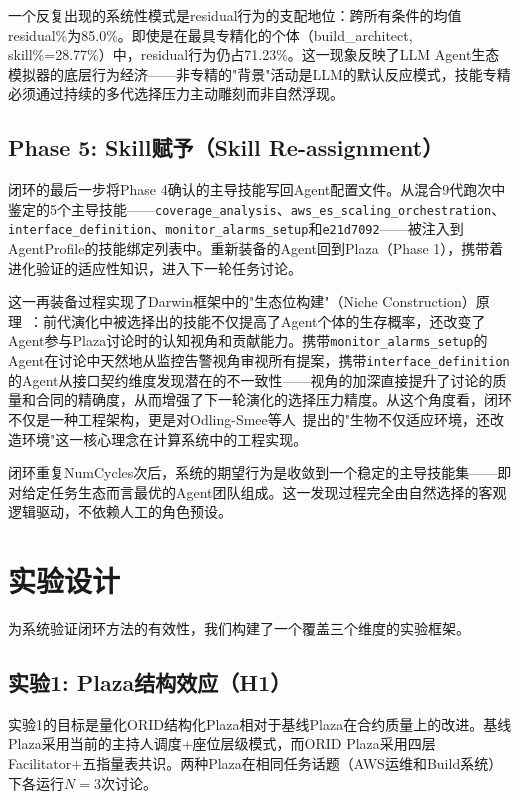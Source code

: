 \documentclass[conference]{IEEEtran}
\begin{document}
一个反复出现的系统性模式是residual行为的支配地位：跨所有条件的均值residual\%为85.0\%。即使是在最具专精化的个体（build\_architect, skill\%=28.77\%）中，residual行为仍占71.23\%。这一现象反映了LLM Agent生态模拟器的底层行为经济——非专精的"背景"活动是LLM的默认反应模式，技能专精必须通过持续的多代选择压力主动雕刻而非自然浮现。

\subsection{Phase 5: Skill赋予（Skill Re-assignment）}

闭环的最后一步将Phase 4确认的主导技能写回Agent配置文件。从混合9代跑次中鉴定的5个主导技能——{\texttt{coverage\_analysis}}、{\texttt{aws\_es\_scaling\_orchestration}}、{\texttt{interface\_definition}}、{\texttt{monitor\_alarms\_setup}}和{\texttt{e21d7092}}——被注入到AgentProfile的技能绑定列表中。重新装备的Agent回到Plaza（Phase 1），携带着进化验证的适应性知识，进入下一轮任务讨论。

这一再装备过程实现了Darwin框架中的"生态位构建"（Niche Construction）原理~\cite{odling2003niche}：前代演化中被选择出的技能不仅提高了Agent个体的生存概率，还改变了Agent参与Plaza讨论时的认知视角和贡献能力。携带{\texttt{monitor\_alarms\_setup}}的Agent在讨论中天然地从监控告警视角审视所有提案，携带{\texttt{interface\_definition}}的Agent从接口契约维度发现潜在的不一致性——视角的加深直接提升了讨论的质量和合同的精确度，从而增强了下一轮演化的选择压力精度。从这个角度看，闭环不仅是一种工程架构，更是对Odling-Smee等人~\cite{odling2003niche}提出的"生物不仅适应环境，还改造环境"这一核心理念在计算系统中的工程实现。

闭环重复NumCycles次后，系统的期望行为是收敛到一个稳定的主导技能集——即对给定任务生态而言最优的Agent团队组成。这一发现过程完全由自然选择的客观逻辑驱动，不依赖人工的角色预设。

\section{实验设计}

为系统验证闭环方法的有效性，我们构建了一个覆盖三个维度的实验框架。

\subsection{实验1: Plaza结构效应（H1）}

实验1的目标是量化ORID结构化Plaza相对于基线Plaza在合约质量上的改进。基线Plaza采用当前的主持人调度+座位层级模式，而ORID Plaza采用四层Facilitator+五指量表共识。两种Plaza在相同任务话题（AWS运维和Build系统）下各运行$N=3$次讨论。
\end{document}
